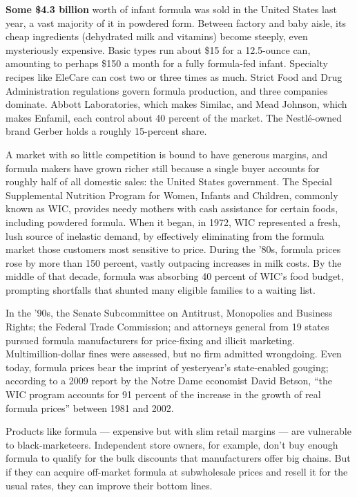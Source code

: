 \textbf{Some \$4.3 billion} worth of infant formula was sold in the
United States last year, a vast majority of it in powdered form. Between
factory and baby aisle, its cheap ingredients (dehydrated milk and
vitamins) become steeply, even mysteriously expensive. Basic types run
about \$15 for a 12.5-ounce can, amounting to perhaps \$150 a month for
a fully formula-fed infant. Specialty recipes like EleCare can cost two
or three times as much. Strict Food and Drug Administration regulations
govern formula production, and three companies dominate. Abbott
Laboratories, which makes Similac, and Mead Johnson, which makes
Enfamil, each control about 40 percent of the market. The Nestlé-owned
brand Gerber holds a roughly 15-percent share.

A market with so little competition is bound to have generous margins,
and formula makers have grown richer still because a single buyer
accounts for roughly half of all domestic sales: the United States
government. The Special Supplemental Nutrition Program for Women,
Infants and Children, commonly known as WIC, provides needy mothers with
cash assistance for certain foods, including powdered formula. When it
began, in 1972, WIC represented a fresh, lush source of inelastic
demand, by effectively eliminating from the formula market those
customers most sensitive to price. During the '80s, formula prices rose
by more than 150 percent, vastly outpacing increases in milk costs. By
the middle of that decade, formula was absorbing 40 percent of WIC's
food budget, prompting shortfalls that shunted many eligible families to
a waiting list.

In the '90s, the Senate Subcommittee on Antitrust, Monopolies and
Business Rights; the Federal Trade Commission; and attorneys general
from 19 states pursued formula manufacturers for price-fixing and
illicit marketing. Multimillion-dollar fines were assessed, but no firm
admitted wrongdoing. Even today, formula prices bear the imprint of
yesteryear's state-enabled gouging; according to a 2009 report by the
Notre Dame economist David Betson, ``the WIC program accounts for 91
percent of the increase in the growth of real formula prices'' between
1981 and 2002.

Products like formula --- expensive but with slim retail margins --- are
vulnerable to black-marketeers. Independent store owners, for example,
don't buy enough formula to qualify for the bulk discounts that
manufacturers offer big chains. But if they can acquire off-market
formula at subwholesale prices and resell it for the usual rates, they
can improve their bottom lines.

